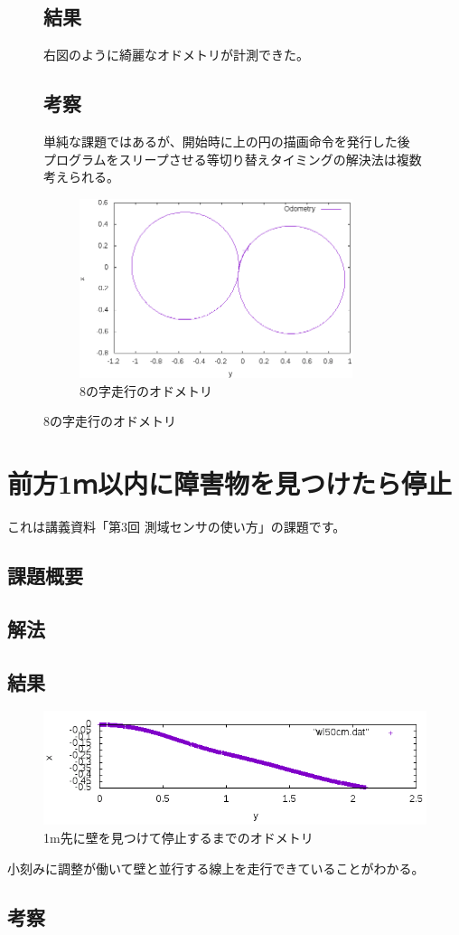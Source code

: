 \documentclass[main]{subfiles}
\begin{document}
\begin{figure}[H]
	\begin{minipage}{0.5\hsize}
		\setlength{\parindent}{1\Cwd}
		\section{結果}
		右図のように綺麗なオドメトリが計測できた。

		\section{考察}
		単純な課題ではあるが、開始時に上の円の描画命令を発行した後
		プログラムをスリープさせる等切り替えタイミングの解決法は複数考えられる。
	\end{minipage}
	\begin{minipage}{0.5\hsize}
		\begin{figure}[H]
			\centering
			\includegraphics[width=8cm]{img/eight.png}
			\caption{8の字走行のオドメトリ}
		\end{figure}
	\end{minipage}
\end{figure}

\chapter{前方1ｍ以内に障害物を見つけたら停止}

これは講義資料「第3回 測域センサの使い方」の課題です。

\section{課題概要}
\section{解法}

\section{結果}
\begin{figure}[H]
	\centering
	\includegraphics[width=15cm]{img/wl50cm.png}
	\caption{1m先に壁を見つけて停止するまでのオドメトリ}
\end{figure}
小刻みに調整が働いて壁と並行する線上を走行できていることがわかる。

\section{考察}
\end{document}
